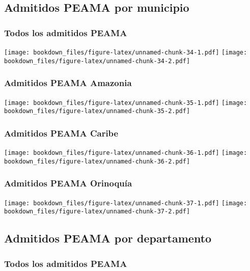 \documentclass[]{article}
\theoremstyle{definition}
\theoremstyle{definition}
\theoremstyle{definition}
\theoremstyle{remark}
\begin{document}
\subsection{Admitidos PEAMA por
municipio}\label{admitidos-peama-por-municipio}

\subsubsection{Todos los admitidos
PEAMA}\label{todos-los-admitidos-peama}

\texttt{[image: bookdown\_files/figure-latex/unnamed-chunk-34-1.pdf]}
\texttt{[image: bookdown\_files/figure-latex/unnamed-chunk-34-2.pdf]}

\subsubsection{Admitidos PEAMA Amazonia}\label{admitidos-peama-amazonia}

\texttt{[image: bookdown\_files/figure-latex/unnamed-chunk-35-1.pdf]}
\texttt{[image: bookdown\_files/figure-latex/unnamed-chunk-35-2.pdf]}

\subsubsection{Admitidos PEAMA Caribe}\label{admitidos-peama-caribe}

\texttt{[image: bookdown\_files/figure-latex/unnamed-chunk-36-1.pdf]}
\texttt{[image: bookdown\_files/figure-latex/unnamed-chunk-36-2.pdf]}

\subsubsection{Admitidos PEAMA
Orinoquía}\label{admitidos-peama-orinoquia}

\texttt{[image: bookdown\_files/figure-latex/unnamed-chunk-37-1.pdf]}
\texttt{[image: bookdown\_files/figure-latex/unnamed-chunk-37-2.pdf]}

\subsection{Admitidos PEAMA por
departamento}\label{admitidos-peama-por-departamento}

\subsubsection{Todos los admitidos
PEAMA}\label{todos-los-admitidos-peama-1}
\end{document}
